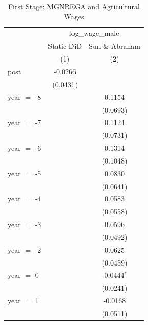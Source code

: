 
\begin{table}[htbp]
   \caption{\label{tab:first_stage} First Stage: MGNREGA and Agricultural Wages}
   \bigskip
   \centering
   \begin{tabular}{lcc}
      \toprule
       & \multicolumn{2}{c}{log\_wage\_male}\\
                                & Static DiD    & Sun \& Abraham \\    
                                & (1)           & (2)\\  
      \midrule 
      post                      & -0.0266       &   \\   
                                & (0.0431)      &   \\   
      year $=$ -8               &               & 0.1154\\   
                                &               & (0.0693)\\   
      year $=$ -7               &               & 0.1124\\   
                                &               & (0.0731)\\   
      year $=$ -6               &               & 0.1314\\   
                                &               & (0.1048)\\   
      year $=$ -5               &               & 0.0830\\   
                                &               & (0.0641)\\   
      year $=$ -4               &               & 0.0583\\   
                                &               & (0.0558)\\   
      year $=$ -3               &               & 0.0596\\   
                                &               & (0.0492)\\   
      year $=$ -2               &               & 0.0625\\   
                                &               & (0.0459)\\   
      year $=$ 0                &               & -0.0444$^{*}$\\   
                                &               & (0.0241)\\   
      year $=$ 1                &               & -0.0168\\   
                                &               & (0.0511)\\   

\end{tabular}
\end{table}
